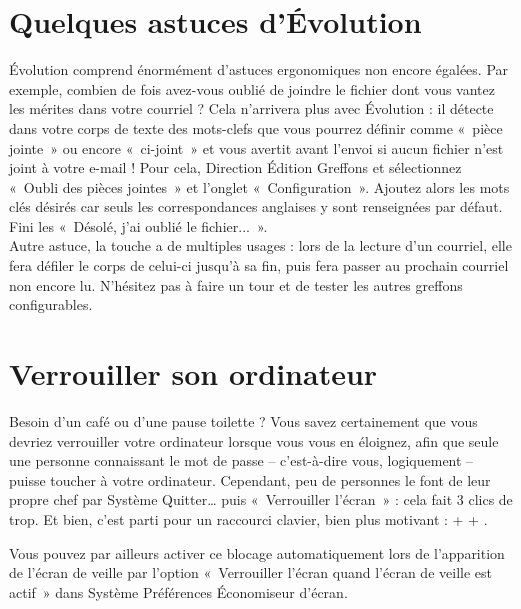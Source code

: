 \section{Quelques astuces d'Évolution}
Évolution comprend énormément d'astuces ergonomiques non encore égalées. Par exemple, combien de fois avez-vous oublié de joindre le fichier dont vous vantez les mérites dans votre courriel ? Cela n'arrivera plus avec Évolution : il détecte dans votre corps de texte des mots-clefs que vous pourrez définir comme «~pièce jointe~» ou encore «~ci-joint~» et vous avertit avant l'envoi si aucun fichier n'est joint à votre e-mail ! Pour cela, Direction Édition \FlecheDroite Greffons et sélectionnez «~Oubli des pièces jointes~» et l'onglet «~Configuration~». Ajoutez alors les mots clés désirés car seuls les correspondances anglaises y sont renseignées par défaut. Fini les «~Désolé, j'ai oublié le fichier...~».\\
Autre astuce, la touche  a de multiples usages : lors de la lecture d'un courriel, elle fera défiler le corps de celui-ci jusqu'à sa fin, puis fera passer au prochain courriel non encore lu. N'hésitez pas à faire un tour et de tester les autres greffons configurables.
\section{Verrouiller son ordinateur}
\label{RefVerrouillageOrdi}
Besoin d'un café ou d'une pause toilette ? Vous savez certainement que vous devriez verrouiller votre ordinateur lorsque vous vous en éloignez, afin que seule une personne connaissant le mot de passe -- c'est-à-dire vous, logiquement -- puisse toucher à votre ordinateur. Cependant, peu de personnes le font de leur propre chef par Système \FlecheDroite Quitter\ldots{} puis «~Verrouiller l'écran~» : cela fait 3 clics de trop. Et bien, c'est parti pour un raccourci clavier, bien plus motivant :  +  + .\par
Vous pouvez par ailleurs activer ce blocage automatiquement lors de l'apparition de l'écran de veille par l'option «~Verrouiller l'écran quand l'écran de veille est actif~» dans Système \FlecheDroite Préférences \FlecheDroite Économiseur d'écran.
